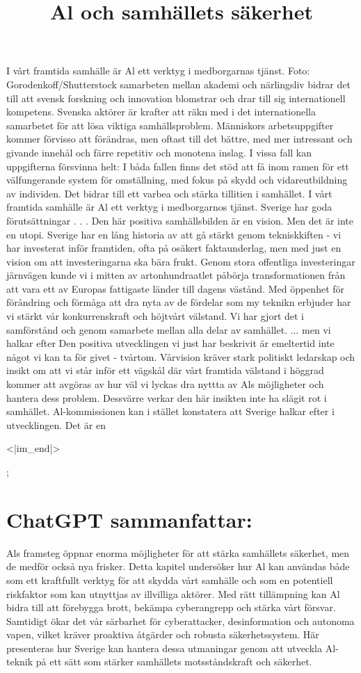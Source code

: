 {{{{{{I vårt framtida samhälle är Al ett verktyg i medborgarnas tjänst. Foto: Gorodenkoff/Shutterstock
samarbeten mellan akademi och närlingsliv bidrar det till att svensk forskning och innovation blomstrar och drar till sig internationell kompetens. Svenska aktörer är krafter att räkn med i det internationella samarbetet för att lösa viktiga samhällsproblem.
Människors arbetsuppgifter kommer förvisso att förändras, men oftast till det bättre, med mer intressant och givande innehål och färre repetitiv och monotena inslag. I vissa fall kan uppgifterna försvinna helt: I båda fallen finns det stöd att få inom ramen för ett välfungerande system för omställning, med fokus på skydd och vidareutbildning av individen. Det bidrar till ett varbea och stärka tillitien i samhället.
I vårt framtida samhälle är Al ett verktyg i medborgarnos tjänst.
Sverige har goda förutsättningar . . .
Den här positiva samhällsbilden är en vision. Men det är inte en utopi. Sverige har en lång historia av att gå stärkt genom tekniskkiften - vi har investerat inför framtiden, ofta på osäkert faktaunderlag, men med just en vision om att investeringarna ska bära frukt. Genom stora offentliga investeringar järnvägen kunde vi i mitten av artonhundraatlet påbörja transformationen från att vara ett av Europas fattigaste länder till dagens västånd. Med öppenhet för föråndring och förmåga att dra nyta av de fördelar som my teknikn erbjuder har vi stärkt vår konkurrenskraft och höjtvårt välstand. Vi har gjort det i samförstånd och genom samarbete mellan alla delar av samhället.
... men vi halkar efter
Den positiva utvecklingen vi just har beskrivit är emeltertid inte något vi kan ta för givet - tvårtom. Vårvision kräver stark politiskt ledarskap och insikt om att vi står inför ett vägskål där vårt framtida välstand i höggrad kommer att avgöras av hur väl vi lyckas dra nyttta av Als möjligheter och hantera dess problem.
Dessvärre verkar den här insikten inte ha slägit rot i samhället. Al-kommissionen kan i stället konstatera att Sverige halkar efter i utvecklingen. Det är en

<|im_end|>};

\title{
Al och samhällets säkerhet
}
\section*{ChatGPT sammanfattar:}
Als framsteg öppnar enorma möjligheter för att stärka samhällets säkerhet, men de medför också nya frisker.
Detta kapitel undersöker hur Al kan användas både som ett kraftfullt verktyg för att skydda vårt samhälle och som en potentiell riskfaktor som kan utnyttjas av illvilliga aktörer. Med rätt tillämpning kan Al bidra till att förebygga brott, bekämpa cyberangrepp och stärka vårt försvar. Samtidigt ökar det vår särbarhet för cyberattacker, desinformation och autonoma vapen, vilket kräver proaktiva åtgärder och robusta säkerhetssystem. Här presenteras hur Sverige kan hantera dessa utmaningar genom att utveckla Al-teknik på ett sätt som stärker samhällets motsståndskraft och säkerhet.
}}}}}
